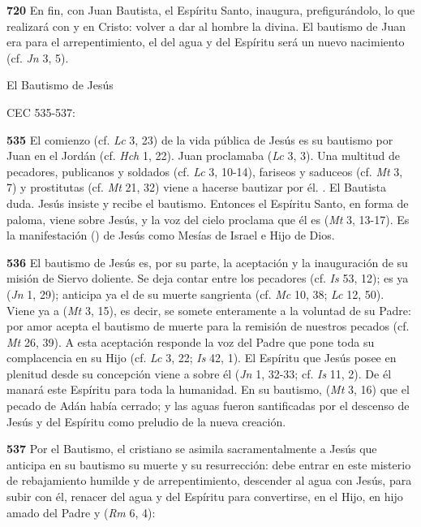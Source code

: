 \begin{body}
\begin{body}
{\textbf{720} En fin, con Juan Bautista, el Espíritu Santo, inaugura, prefigurándolo, lo que realizará con y en Cristo: volver a dar al hombre la  divina. El bautismo de Juan era para el arrepentimiento, el del agua y del Espíritu será un nuevo nacimiento (cf. \emph{Jn} 3, 5).

El Bautismo de Jesús

CEC 535-537:

\textbf{535} El comienzo (cf. \emph{Lc} 3, 23) de la vida pública de Jesús es su bautismo por Juan en el Jordán (cf. \emph{Hch} 1, 22). Juan proclamaba  (\emph{Lc} 3, 3). Una multitud de pecadores, publicanos y soldados (cf. \emph{Lc} 3, 10-14), fariseos y saduceos (cf. \emph{Mt} 3, 7) y prostitutas (cf. \emph{Mt} 21, 32) viene a hacerse bautizar por él. . El Bautista duda. Jesús insiste y recibe el bautismo. Entonces el Espíritu Santo, en forma de paloma, viene sobre Jesús, y la voz del cielo proclama que él es  (\emph{Mt} 3, 13-17). Es la manifestación () de Jesús como Mesías de Israel e Hijo de Dios.

\textbf{536} El bautismo de Jesús es, por su parte, la aceptación y la inauguración de su misión de Siervo doliente. Se deja contar entre los pecadores (cf. \emph{Is} 53, 12); es ya  (\emph{Jn} 1, 29); anticipa ya el  de su muerte sangrienta (cf. \emph{Mc} 10, 38; \emph{Lc} 12, 50). Viene ya a  (\emph{Mt} 3, 15), es decir, se somete enteramente a la voluntad de su Padre: por amor acepta el bautismo de muerte para la remisión de nuestros pecados (cf. \emph{Mt} 26, 39). A esta aceptación responde la voz del Padre que pone toda su complacencia en su Hijo (cf. \emph{Lc} 3, 22; \emph{Is} 42, 1). El Espíritu que Jesús posee en plenitud desde su concepción viene a  sobre él (\emph{Jn} 1, 32-33; cf. \emph{Is} 11, 2). De él manará este Espíritu para toda la humanidad. En su bautismo,  (\emph{Mt} 3, 16) que el pecado de Adán había cerrado; y las aguas fueron santificadas por el descenso de Jesús y del Espíritu como preludio de la nueva creación.

\textbf{537} Por el Bautismo, el cristiano se asimila sacramentalmente a Jesús que anticipa en su bautismo su muerte y su resurrección: debe entrar en este misterio de rebajamiento humilde y de arrepentimiento, descender al agua con Jesús, para subir con él, renacer del agua y del Espíritu para convertirse, en el Hijo, en hijo amado del Padre y  (\emph{Rm} 6, 4):

}
\end{body}
\end{body}

